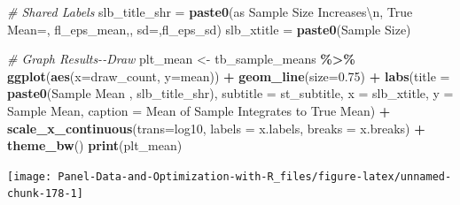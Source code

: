 \documentclass[
]{book}
\newenvironment{Shaded}{\begin{snugshade}}{\end{snugshade}}
\newcommand{\CharTok}[1]{\textcolor[rgb]{0.31,0.60,0.02}{#1}}
\newcommand{\CommentTok}[1]{\textcolor[rgb]{0.56,0.35,0.01}{\textit{#1}}}
\newcommand{\DataTypeTok}[1]{\textcolor[rgb]{0.13,0.29,0.53}{#1}}
\newcommand{\FloatTok}[1]{\textcolor[rgb]{0.00,0.00,0.81}{#1}}
\newcommand{\KeywordTok}[1]{\textcolor[rgb]{0.13,0.29,0.53}{\textbf{#1}}}
\newcommand{\NormalTok}[1]{#1}
\newcommand{\OperatorTok}[1]{\textcolor[rgb]{0.81,0.36,0.00}{\textbf{#1}}}
\newcommand{\StringTok}[1]{\textcolor[rgb]{0.31,0.60,0.02}{#1}}
\begin{document}
\begin{Shaded}
\begin{Highlighting}[]
\CommentTok{\# Shared Labels}
\NormalTok{slb\_title\_shr =}\StringTok{ }\KeywordTok{paste0}\NormalTok{(}\StringTok{\textquotesingle{}as Sample Size Increases}\CharTok{\textbackslash{}n}\StringTok{\textquotesingle{}}\NormalTok{,}
                       \StringTok{\textquotesingle{}True Mean=\textquotesingle{}}\NormalTok{, fl\_eps\_mean,}\StringTok{\textquotesingle{}, sd=\textquotesingle{}}\NormalTok{,fl\_eps\_sd)}
\NormalTok{slb\_xtitle =}\StringTok{ }\KeywordTok{paste0}\NormalTok{(}\StringTok{\textquotesingle{}Sample Size\textquotesingle{}}\NormalTok{)}

\CommentTok{\# Graph Results{-}{-}Draw}
\NormalTok{plt\_mean \textless{}{-}}\StringTok{ }\NormalTok{tb\_sample\_means }\OperatorTok{\%\textgreater{}\%}
\StringTok{  }\KeywordTok{ggplot}\NormalTok{(}\KeywordTok{aes}\NormalTok{(}\DataTypeTok{x=}\NormalTok{draw\_count, }\DataTypeTok{y=}\NormalTok{mean)) }\OperatorTok{+}
\StringTok{  }\KeywordTok{geom\_line}\NormalTok{(}\DataTypeTok{size=}\FloatTok{0.75}\NormalTok{) }\OperatorTok{+}
\StringTok{  }\KeywordTok{labs}\NormalTok{(}\DataTypeTok{title =} \KeywordTok{paste0}\NormalTok{(}\StringTok{\textquotesingle{}Sample Mean \textquotesingle{}}\NormalTok{, slb\_title\_shr),}
       \DataTypeTok{subtitle =}\NormalTok{ st\_subtitle,}
       \DataTypeTok{x =}\NormalTok{ slb\_xtitle,}
       \DataTypeTok{y =} \StringTok{\textquotesingle{}Sample Mean\textquotesingle{}}\NormalTok{,}
       \DataTypeTok{caption =} \StringTok{\textquotesingle{}Mean of Sample Integrates to True Mean\textquotesingle{}}\NormalTok{) }\OperatorTok{+}
\StringTok{  }\KeywordTok{scale\_x\_continuous}\NormalTok{(}\DataTypeTok{trans=}\StringTok{\textquotesingle{}log10\textquotesingle{}}\NormalTok{, }\DataTypeTok{labels =}\NormalTok{ x.labels, }\DataTypeTok{breaks =}\NormalTok{ x.breaks) }\OperatorTok{+}
\StringTok{  }\KeywordTok{theme\_bw}\NormalTok{()}
\KeywordTok{print}\NormalTok{(plt\_mean)}
\end{Highlighting}
\end{Shaded}

\begin{center}\texttt{[image: Panel-Data-and-Optimization-with-R\_files/figure-latex/unnamed-chunk-178-1]} \end{center}
\end{document}
